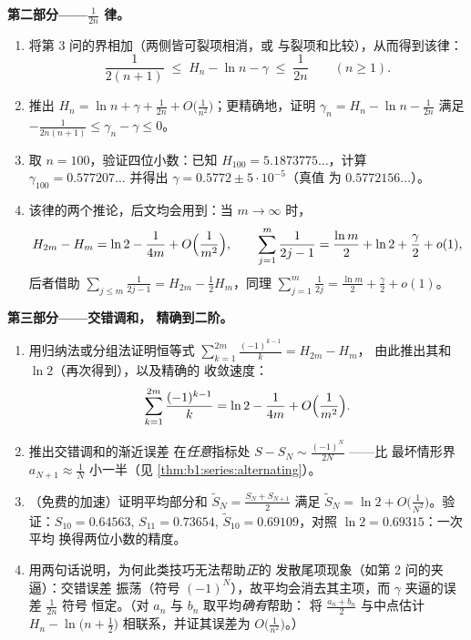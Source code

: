 \begin{problem}[{周末问题——$H_n = \ln n + \gamma +
\frac{1}{2n} + O(n^{-2})$，并将 $1 - \frac12 +
\frac13 - \dots$ 重排为 $\frac{\ln 2}{2}$}]
\medskip
\noindent\textbf{第二部分——$\frac{1}{2n}$ 律。}
\begin{enumerate}[resume]
  \item 将第 3 问的界相加（两侧皆可裂项相消，或
        与裂项和比较），从而得到该律：
        \[
        \frac{1}{2(n+1)} \;\leq\; H_n - \ln n - \gamma \;\leq\;
        \frac{1}{2n} \qquad (n \geq 1).
        \]
  \item 推出 $H_n = \ln n + \gamma + \frac{1}{2n} +
        O\bigl(\frac{1}{n^2}\bigr)$；更精确地，证明
        $\gamma_n = H_n - \ln n - \frac{1}{2n}$ 满足
        $-\frac{1}{2n(n+1)} \leq \gamma_n - \gamma \leq 0$。
  \item 取 $n = 100$，验证四位小数：已知 $H_{100} =
        5.1873775\dots$，计算 $\gamma_{100} = 0.577207\dots$
        并得出 $\gamma = 0.5772 \pm 5\cdot10^{-5}$（真值
        为 $0.5772156\dots$）。
  \item 该律的两个推论，后文均会用到：当 $m \to
        \infty$ 时，
        \[
        H_{2m} - H_m = \ln 2 - \frac{1}{4m} +
        O\Bigl(\frac{1}{m^2}\Bigr),
        \qquad
        \sum_{j=1}^{m} \frac{1}{2j-1} = \frac{\ln m}{2} + \ln 2
        + \frac\gamma2 + o(1) ,
        \]
        后者借助 $\sum_{j \leq m} \frac{1}{2j-1} = H_{2m}
        - \frac12 H_m$，同理 $\sum_{j=1}^{m}
        \frac{1}{2j} = \frac{\ln m}{2} + \frac\gamma2 + o(1)$。
\end{enumerate}

\medskip
\noindent\textbf{第三部分——交错调和，
精确到二阶。}
\begin{enumerate}[resume]
  \item 用归纳法或分组法证明恒等式
        $\sum_{k=1}^{2m} \frac{(-1)^{k-1}}{k} = H_{2m} - H_m$，
        由此推出其和 $\ln 2$（再次得到），以及精确的
        收敛速度：
        \[
        \sum_{k=1}^{2m} \frac{(-1)^{k-1}}{k}
        = \ln 2 - \frac{1}{4m} + O\Bigl(\frac{1}{m^2}\Bigr) .
        \]
  \item 推出交错调和的渐近误差
        在\emph{任意}指标处 $S - S_N \sim
        \frac{(-1)^N}{2N}$ ——比
        最坏情形界 $a_{N+1} \approx \frac1N$ 小一半（见
        \cref{thm:b1:series:alternating}）。
  \item （免费的加速）证明平均部分和
        $\tilde S_N = \frac{S_N + S_{N+1}}{2}$ 满足 $\tilde
        S_N = \ln 2 + O\bigl(\frac{1}{N^2}\bigr)$。验证：$S_{10}
        = 0.64563$, $S_{11} = 0.73654$, $\tilde S_{10} =
        0.69109$，对照 $\ln 2 = 0.69315$：一次平均
        换得两位小数的精度。
  \item 用两句话说明，为何此类技巧无法帮助\emph{正}的
        发散尾项现象（如第 2 问的夹逼）：交错误差
        振荡（符号
        $(-1)^N$），故平均会消去其主项，而
        $\gamma$ 夹逼的误差 $\frac{1}{2n}$ 符号
        恒定。（对 $a_n$ 与 $b_n$ 取平均\emph{确有}帮助：
        将 $\frac{a_n + b_n}{2}$ 与中点估计
        $H_n - \ln\bigl(n + \frac12\bigr)$ 相联系，并证其误差为
        $O\bigl(\frac{1}{n^2}\bigr)$。）
\end{enumerate}


\end{problem}
